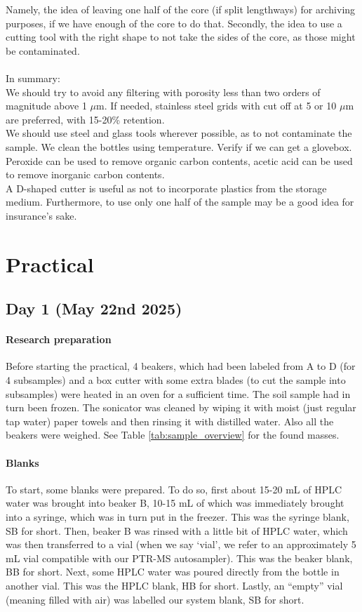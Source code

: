 \documentclass[twocolumn,a4paper,aps,amsmath,amssymb,floatfix,superscriptaddress]{revtex4-2}
\begin{document}
	Namely, the idea of leaving one half of the core (if split lengthways) for archiving purposes, if we have enough of the core to do that. Secondly, the idea to use a cutting tool with the right shape to not take the sides of the core, as those might be contaminated.\\
	\\
	In summary:\\
	We should try to avoid any filtering with porosity less than two orders of magnitude above 1 $\mu$m. If needed, stainless steel grids with cut off at 5 or 10 $\mu$m are preferred, with 15-20\% retention.\\
	We should use steel and glass tools wherever possible, as to not contaminate the sample.
	We clean the bottles using temperature. Verify if we can get a glovebox.\\
	Peroxide can be used to remove organic carbon contents, acetic acid can be used to remove inorganic carbon contents.\\
	A D-shaped cutter is useful as not to incorporate plastics from the storage medium. Furthermore, to use only one half of the sample may be a good idea for insurance's sake.
	
	\section{Practical}
	\subsection{Day 1 (May 22nd 2025)}
	\paragraph{Research preparation}
	Before starting the practical, 4 beakers, which had been labeled from A to D (for 4 subsamples) and a box cutter with some extra blades (to cut the sample into subsamples) were heated in an oven for a sufficient time. The soil sample had in turn been frozen. The sonicator was cleaned by wiping it with moist (just regular tap water) paper towels and then rinsing it with distilled water. Also all the beakers were weighed. See Table \ref{tab:sample_overview} for the found masses.
	\paragraph{Blanks}
	To start, some blanks were prepared. To do so, first about 15-20 mL of HPLC water was brought into beaker B, 10-15 mL of which was immediately brought into a syringe, which was in turn put in the freezer. This was the syringe blank, SB for short. Then, beaker B was rinsed with a little bit of HPLC water, which was then transferred to a vial (when we say `vial', we refer to an approximately 5 mL vial compatible with our PTR-MS autosampler). This was the beaker blank, BB for short. Next, some HPLC water was poured directly from the bottle in another vial. This was the HPLC blank, HB for short. Lastly, an ``empty'' vial (meaning filled with air) was labelled our system blank, SB for short.
\end{document}
